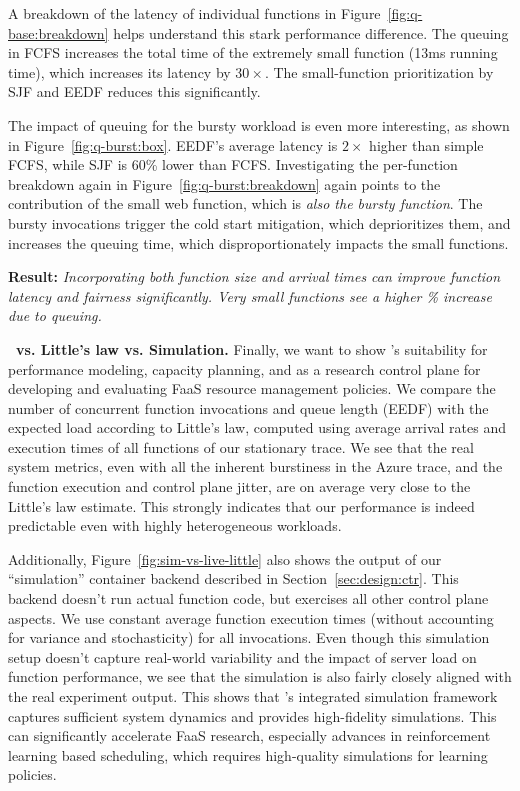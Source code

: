 A breakdown of the latency of individual functions in Figure~\ref{fig:q-base:breakdown} helps understand this stark performance difference.
The queuing in FCFS increases the total time of the extremely small  function (13ms running time), which increases its latency by $30\times$.
The small-function prioritization by SJF and EEDF reduces this significantly. 

The impact of queuing for the bursty workload is even more interesting, as shown in Figure~\ref{fig:q-burst:box}.
EEDF's average latency is $2\times$ higher than simple FCFS, while SJF is 60\% lower than FCFS. 
Investigating the per-function breakdown again in Figure~\ref{fig:q-burst:breakdown} again points to the contribution of the small web function, which is \emph{also the bursty function}.
The bursty invocations trigger the cold start mitigation, which deprioritizes them, and increases the queuing time, which disproportionately impacts the small functions.

\noindent \textbf{Result:} \emph{Incorporating both function size and arrival times can improve function latency and fairness significantly. Very small functions see a higher \% increase due to queuing.}




\noindent \textbf{\sysname~vs. Little's law vs. Simulation.}
Finally, we want to show \sysname's suitability for performance modeling, capacity planning, and as a research control plane for developing and evaluating FaaS resource management policies.
We compare the number of concurrent function invocations and queue length (EEDF) with the expected load according to Little's law, computed using average arrival rates and execution times of all functions of our stationary trace. 
We see that the real system metrics, even with all the inherent burstiness in the Azure trace, and the function execution and control plane jitter, are on average very close to the Little's law estimate.
This strongly indicates that our performance is indeed predictable even with highly heterogeneous workloads.

Additionally, Figure~\ref{fig:sim-vs-live-little} also shows the output of our ``simulation'' container backend described in Section~\ref{sec:design:ctr}.
This backend doesn't run actual function code, but exercises all other control plane aspects.
We use constant average function execution times (without accounting for variance and stochasticity) for all invocations.
Even though this simulation setup doesn't capture real-world variability and the impact of server load on function performance, we see that the simulation is also fairly closely aligned with the real experiment output.
This shows that \sysname's integrated simulation framework captures sufficient system dynamics and provides high-fidelity simulations.
This can significantly accelerate FaaS research, especially advances in reinforcement learning based scheduling, which requires high-quality simulations for learning policies. 

